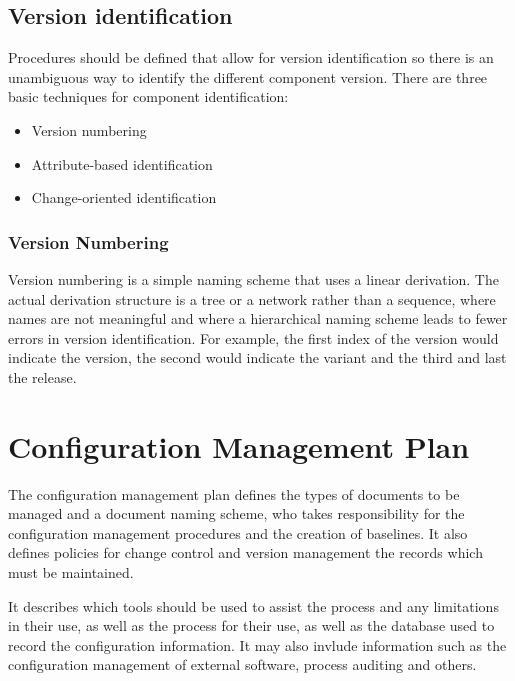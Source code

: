 \subsection{Version identification}
Procedures should be defined that allow for version identification so there is an unambiguous way to identify the different component version. There are three basic techniques for component identification:
\begin{itemize}
    \item Version numbering
    \item Attribute-based identification
    \item Change-oriented identification
\end{itemize}

\subsubsection{Version Numbering}
Version numbering is a simple naming scheme that uses a linear derivation. The actual derivation structure is a tree or a network rather than a sequence, where names are not meaningful and where a hierarchical naming scheme leads to fewer errors in version identification.
For example, the first index of the version would indicate the version, the second would indicate the variant and the third and last the release.

\section{Configuration Management Plan}
The configuration management plan defines the types of documents to be managed and a document naming scheme, who takes responsibility for the configuration management procedures and the creation of baselines. It also defines policies for change control and version management the records which must be maintained.

It describes which tools should be used to assist the process and any limitations in their use, as well as the process for their use, as well as the database used to record the configuration information. It may also invlude information such as the configuration management of external software, process auditing and others.

